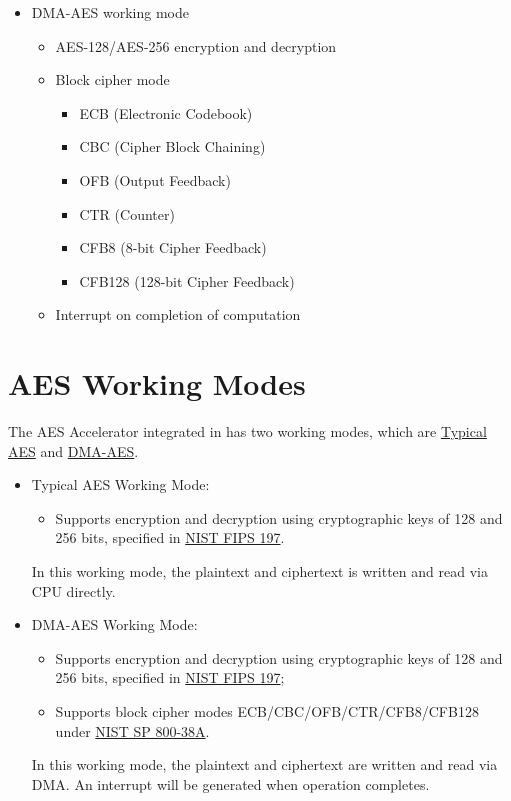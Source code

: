 \documentclass[main\_\_EN.tex]{subfiles}
\begin{document}
    \begin{itemize}
    \item DMA-AES working mode
        \begin{itemize}
            \item AES-128/AES-256 encryption and decryption
            \item Block cipher mode
                \begin{itemize}
                    \item ECB (Electronic Codebook)
                    \item CBC (Cipher Block Chaining)
                    \item OFB (Output Feedback)
                    \item CTR (Counter)
                    \item CFB8 (8-bit Cipher Feedback)
                    \item CFB128 (128-bit Cipher Feedback)
                \end{itemize}
            \item Interrupt on completion of computation    
        \end{itemize}
    \end{itemize}


\section{AES Working Modes}

The AES Accelerator integrated in \chipname{} has two working modes, which are \hyperref[sec:aes-typical-modes]{Typical AES} and \hyperref[sec:aes-dma-aes]{DMA-AES}.

\begin{itemize}
    \item Typical AES Working Mode: \begin{itemize}
        \item Supports encryption and decryption using cryptographic keys of 128 and 256 bits, specified in \href{https://nvlpubs.nist.gov/nistpubs/FIPS/NIST.FIPS.197.pdf}{NIST FIPS 197}.
    \end{itemize}
    In this working mode, the plaintext and ciphertext is written and read via CPU directly. 
    \item DMA-AES Working Mode: 
    \begin{itemize}
        \item Supports encryption and decryption using cryptographic keys of 128 and 256 bits, specified in \href{https://nvlpubs.nist.gov/nistpubs/FIPS/NIST.FIPS.197.pdf}{NIST FIPS 197}; 
        \item Supports block cipher modes ECB/CBC/OFB/CTR/CFB8/CFB128 under \href{https://nvlpubs.nist.gov/nistpubs/Legacy/SP/nistspecialpublication800-38a.pdf}{NIST SP 800-38A}.
    \end{itemize}
    In this working mode, the plaintext and ciphertext are written and read via DMA. An interrupt will be generated when operation completes.
\end{itemize}
\end{document}
